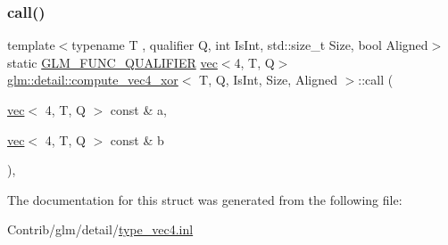 \subsubsection{\texorpdfstring{call()}{call()}}
{\footnotesize\ttfamily template$<$typename T , qualifier Q, int Is\+Int, std\+::size\+\_\+t Size, bool Aligned$>$ \\
static \mbox{\hyperlink{setup_8hpp_a33fdea6f91c5f834105f7415e2a64407}{G\+L\+M\+\_\+\+F\+U\+N\+C\+\_\+\+Q\+U\+A\+L\+I\+F\+I\+ER}} \mbox{\hyperlink{structglm_1_1vec}{vec}}$<$4, T, Q$>$ \mbox{\hyperlink{structglm_1_1detail_1_1compute__vec4__xor}{glm\+::detail\+::compute\+\_\+vec4\+\_\+xor}}$<$ T, Q, Is\+Int, Size, Aligned $>$\+::call (\begin{DoxyParamCaption}\item[{\mbox{\hyperlink{structglm_1_1vec}{vec}}$<$ 4, T, Q $>$ const \&}]{a,  }\item[{\mbox{\hyperlink{structglm_1_1vec}{vec}}$<$ 4, T, Q $>$ const \&}]{b }\end{DoxyParamCaption})\hspace{0.3cm}{\ttfamily [inline]}, {\ttfamily [static]}}



The documentation for this struct was generated from the following file\+:\begin{DoxyCompactItemize}
\item 
Contrib/glm/detail/\mbox{\hyperlink{type__vec4_8inl}{type\+\_\+vec4.\+inl}}\end{DoxyCompactItemize}
